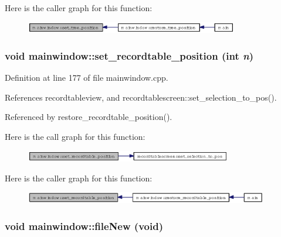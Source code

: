 Here is the caller graph for this function:\begin{figure}[H]
\begin{center}
\leavevmode
\includegraphics[width=263pt]{classmainwindow_1ea5fc01161f568df189d539468a31b5_icgraph}
\end{center}
\end{figure}
\subsubsection{\setlength{\rightskip}{0pt plus 5cm}void mainwindow::set\_\-recordtable\_\-position (int {\em n})}\label{classmainwindow_ab31b7cddf7fbd4ab77b90ae46b52fde}




Definition at line 177 of file mainwindow.cpp.

References recordtableview, and recordtablescreen::set\_\-selection\_\-to\_\-pos().

Referenced by restore\_\-recordtable\_\-position().

Here is the call graph for this function:\begin{figure}[H]
\begin{center}
\leavevmode
\includegraphics[width=255pt]{classmainwindow_ab31b7cddf7fbd4ab77b90ae46b52fde_cgraph}
\end{center}
\end{figure}


Here is the caller graph for this function:\begin{figure}[H]
\begin{center}
\leavevmode
\includegraphics[width=299pt]{classmainwindow_ab31b7cddf7fbd4ab77b90ae46b52fde_icgraph}
\end{center}
\end{figure}
\subsubsection{\setlength{\rightskip}{0pt plus 5cm}void mainwindow::file\-New (void)\hspace{0.3cm}{\tt  [private, slot]}}\label{classmainwindow_7b27eac943c2c3b42b8c1709c08cd160}




